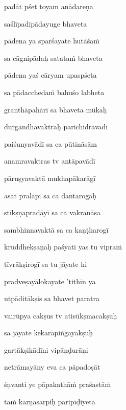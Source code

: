 \ujvers\nemsloka 
padāt pśet toyam anādareṇa
\dontdisplaylinenum

\nemslokab 
saślīpadīpādayuge bhaveta \danda\dontdisplaylinenum

\nemslokac 
pādena ya sparśayate hutāśa\.m
\dontdisplaylinenum

\nemslokad 
sa cāgnipādaḥ satata\.m bhaveta \veg\dontdisplaylinenum

\ujvers\nemsloka 
pādena yaś cāryam upaspśeta
\dontdisplaylinenum

\nemslokab 
sa pādaccheda\.m bahuśo labheta \danda\dontdisplaylinenum

\nemslokac 
granthāpahārī sa bhaveta mūkaḥ
\dontdisplaylinenum

\nemslokad 
durgandhavaktraḥ parichidravādī \veg\dontdisplaylinenum

\ujvers\nemsloka 
paiśunyavādī sa ca pūtināsām
\dontdisplaylinenum

\nemslokab 
anamravaktras tv antāpavādī \danda\dontdisplaylinenum

\nemslokac 
pāruṣyavaktā mukhapākarāgī
\dontdisplaylinenum

\nemslokad 
asat pralāpī sa ca dantarogaḥ \veg\dontdisplaylinenum

\ujvers\nemsloka 
stīkṣṇapradāyī sa ca vakranāsa
\dontdisplaylinenum

\nemslokab 
sambhinnavaktā sa ca kaṇṭharogī \danda\dontdisplaylinenum

\nemslokac 
kruddhekṣaṇaḥ paśyati yas tu vipra\.m
\dontdisplaylinenum

\nemslokad 
tīvrākṣirogī sa tu jāyate hi \veg\dontdisplaylinenum

\ujvers\nemsloka 
pradveṣayālokayate 'tithīn ya
\dontdisplaylinenum

\nemslokab 
utpāditākṣis sa bhavet paratra \danda\dontdisplaylinenum

\nemslokac 
vairūpya cakṣus tv atisūkṣmacakṣuḥ
\dontdisplaylinenum

\nemslokad 
sa jāyate kekarapiṅgayakṣuḥ \veg\dontdisplaylinenum

\ujvers\nemsloka 
gartākṣikādīni vipāṇḍurāṇi
\dontdisplaylinenum

\nemslokab 
netrāmayāny eva ca pāpadoṣāt \danda\dontdisplaylinenum

\nemslokac 
śṇvanti ye pāpakathā\.m praśastā\.m
\dontdisplaylinenum

\nemslokad 
tā\.m karṇasarpiḥ paripīḍiyeta \veg\dontdisplaylinenum

